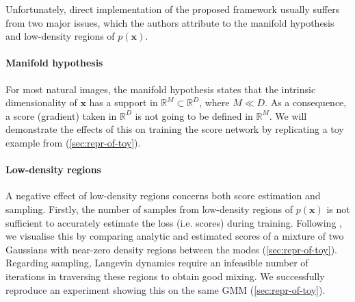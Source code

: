 \vspace{1mm}

Unfortunately, direct implementation of the proposed framework usually suffers from two major issues, which the authors attribute to the manifold hypothesis and low-density regions of $p(\mathbf{x})$. 

\paragraph{Manifold hypothesis} For most natural images, the manifold hypothesis states that the intrinsic dimensionality of $\mathbf{x}$ has a support in $\mathbb{R}^M \subset \mathbb{R}^D$, where $M \ll D$. As a consequence, a score (gradient) taken in $\mathbb{R}^D$ is not going to be defined in $\mathbb{R}^M$. We will demonstrate the effects of this on training the score network by replicating a toy example from \cite{ncsn-paper} (\autoref{sec:repr-of-toy}).

\paragraph{Low-density regions} A negative effect of low-density regions concerns both score estimation and sampling. 
Firstly, the number of samples from low-density regions of $p(\mathbf{x})$ is not sufficient to accurately estimate the loss (i.e. scores) during training. Following \cite{ncsn-paper}, we visualise this by comparing analytic and estimated scores of a mixture of two Gaussians with near-zero density regions between the modes (\autoref{sec:repr-of-toy}).
Regarding sampling, Langevin dynamics require an infeasible number of iterations in traversing these regions to obtain good mixing. We successfully reproduce an experiment showing this on the same GMM (\autoref{sec:repr-of-toy}).

